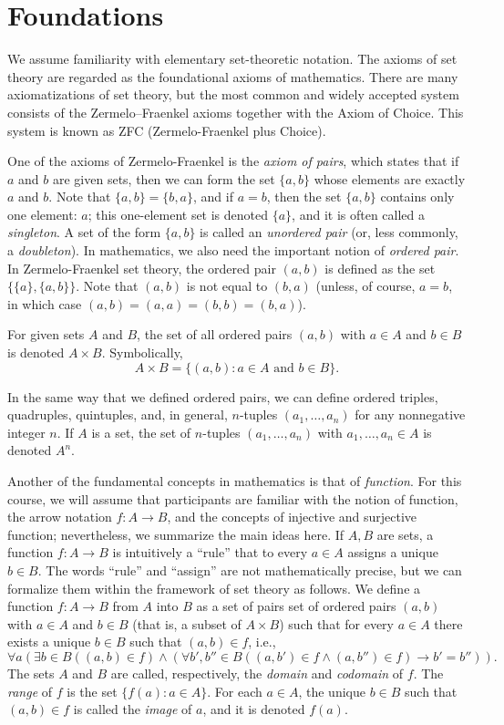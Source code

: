\chapter{Foundations}

We assume familiarity with elementary set-theoretic notation.
The axioms of set theory are regarded as the foundational axioms of mathematics.
There are many axiomatizations of set theory, but the most common and widely accepted system consists of  the Zermelo–Fraenkel axioms together with the Axiom of Choice.
This system is known as ZFC (Zermelo-Fraenkel plus Choice).

One of the axioms of Zermelo-Fraenkel is the \emph{axiom of pairs}, which states  that if $a$ and $b$ are given sets, then we can form the set $\{a,b\}$ whose elements are exactly $a$ and $b$.
Note that $\{a,b\}=\{b,a\}$, and if $a=b$, then the set $\{a,b\}$ contains only one element:
$a$;
this one-element set is denoted $\{a\}$, and it is often called a \emph{singleton}.
A set of the form $\{a,b\}$ is called an \emph{unordered pair} (or, less commonly, a \emph{doubleton}).
In mathematics, we also need the important notion of \emph{ordered pair}.
In Zermelo-Fraenkel set theory, the ordered pair $(a,b)$ is defined as the set $\{\{a\},\{a,b\}\}$.
Note that $(a,b)$ is not equal to $(b,a)$ (unless, of course, $a=b$, in which case $(a, b)=(a,a)=(b,b)=(b,a)$).

For given sets $A$ and $B$, the set of all ordered pairs $(a,b)$  with $a\in A$ and $b\in B$ is denoted $A\times B$.
Symbolically,
\[
  A\times B=\{(a,b) \colon a\in A \text{ and } b\in B\}.
\]

In the same way that we defined ordered pairs, we can define ordered triples, quadruples, quintuples, and, in general, $n$-tuples $(a_1,\dots, a_n)$ for any nonnegative integer $n$.
If $A$ is a set, the set of $n$-tuples $(a_1,\dots, a_n)$ with $a_1,\dots, a_n\in A$ is denoted $A^n$.

Another of the fundamental concepts in mathematics is that of \emph{function}.
For this course, we will assume that participants are familiar with the notion of function, the arrow notation $f\colon A\to B$, and the concepts of injective and surjective function;
nevertheless, we summarize the main ideas here.
If $A,B$ are sets, a function $f:A\to B$ is intuitively a “rule” that to every $a\in A$ assigns a unique $b\in B$.
The words “rule” and “assign” are not mathematically precise, but we can formalize them within the framework of set theory as follows.
We define a function $f:A\to B$ from $A$ into $B$  as a set of pairs set of ordered pairs $(a,b)$ with $a\in A$ and $b\in B$ (that is, a subset of $A\times B$)
such that for  every $a\in A$ there exists  a unique $b\in B$ such that $(a,b)\in f$, i.e.,
\[
  \forall a (\exists b\in B ((a,b) \in f) \land (\forall b',b'' \in B((a,b')\in f \land (a,b'')\in f) \to b'=b'')).
\]
The sets $A$ and $B$ are called, respectively, the \emph{domain} and \emph{codomain} of $f$.
The \emph{range} of $f$ is the set $\{f(a) \colon a\in A \}$.
For each $a\in A$, the unique $b\in B$ such that $(a,b)\in f$ is called the \emph{image} of $a$, and it is denoted $f(a)$.

